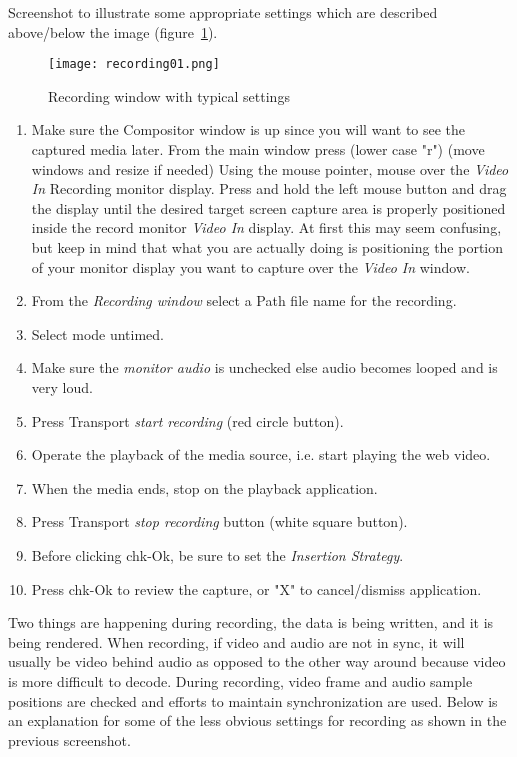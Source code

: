 Screenshot to illustrate some appropriate settings which are described above/below the image (figure~\ref{fig:recording01}).

\begin{figure}[htpb]
    \centering
    \texttt{[image: recording01.png]}
    \caption{Recording window with typical settings}
    \label{fig:recording01}
\end{figure}

\begin{enumerate}[start=3]    
    \item Make sure the Compositor window is up since you will want to see the captured media later. From the main window press (lower case "r") (move windows and resize if needed) Using the mouse pointer, mouse over the \textit{Video In} Recording monitor display. Press and hold the left mouse button and drag the display until the desired target screen capture area is properly positioned inside the record monitor \textit{Video In} display.  At first this may seem confusing, but keep in mind that what you are actually doing is positioning the portion of your monitor display you want to capture over the \textit{Video In} window.
    \item From the \textit{Recording window} select a Path file name for the recording.
    \item Select mode untimed.
    \item Make sure the \textit{monitor audio} is unchecked else audio becomes looped and is very loud.
    \item Press Transport \textit{start recording} (red circle button).
    \item Operate the playback of the media source, i.e. start playing the web video.
    \item When the media ends, stop on the playback application.
    \item Press Transport \textit{stop recording} button (white square button).
    \item Before clicking chk-Ok, be sure to set the \textit{Insertion Strategy}.
    \item Press chk-Ok to review the capture, or "X" to cancel/dismiss application.    
\end{enumerate}

Two things are happening during recording, the data is being written, and it is being rendered.  When recording, if video and audio are not in sync, it will usually be video behind audio as opposed to the other way around because video is more difficult to decode.  During recording, video frame and audio sample positions are checked and efforts to maintain synchronization are used.   Below is an explanation for some of the less obvious settings for recording as shown in the previous screenshot.
